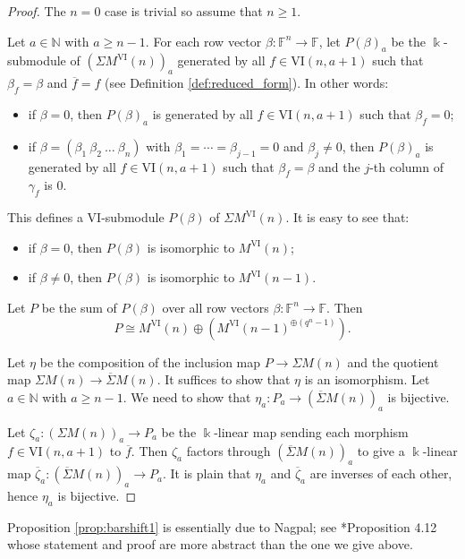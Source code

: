 \documentclass{amsart}
\numberwithin{equation}{section}
\newcommand{\N}{{\mathbb{N}}}
\newcommand{\F}{{\mathbb{F}}}
\newcommand{\VI}{{\mathrm{VI}}}
\newcommand{\SSigma}{{\overline{\Sigma}}}
\begin{document}
\begin{proof}
   The $n=0$ case is trivial so assume that $n\geqslant 1$. 

   Let $a\in \N$ with $a\geqslant n-1$. For each row vector $\beta: \F^n \to \F$, let $P(\beta)_a$ be the $\Bbbk$-submodule of $(\Sigma M^{\VI}(n))_a$ generated by all $f\in \VI(n,a+1)$ such that $\beta_f=\beta$ and $\overline{f}=f$ (see Definition \ref{def:reduced_form}). In other words:
   \begin{itemize}
      \item if $\beta=0$, then $P(\beta)_a$ is generated by all $f\in \VI(n,a+1)$ such that $\beta_f=0$;
      \item if $\beta=(\beta_1 \ \beta_2 \ \ldots \ \beta_n)$ with $\beta_1=\cdots=\beta_{j-1}=0$ and $\beta_j\neq 0$, then $P(\beta)_a$ is generated by all $f\in \VI(n,a+1)$ such that $\beta_f=\beta$ and the $j$-th column of $\gamma_f$ is $0$.
   \end{itemize}    
   This defines a $\VI$-submodule $P(\beta)$ of $\Sigma M^{\VI}(n)$. It is easy to see that:
   \begin{itemize}
      \item if $\beta=0$, then $P(\beta)$ is isomorphic to $M^{\VI}(n)$;
      \item if $\beta\neq 0$, then $P(\beta)$ is isomorphic to $M^{\VI}(n-1)$.
   \end{itemize} 
   Let $P$ be the sum of $P(\beta)$ over all row vectors $\beta: \F^n \to \F$. Then 
   \[ P \cong M^{\VI}(n) \oplus \left( M^{\VI}(n-1)^{\oplus (q^n-1)} \right). \] 
   
   Let $\eta$ be the composition of the inclusion map $P\to \Sigma M(n)$ and the quotient map $\Sigma M(n) \to \SSigma M(n)$. It suffices to show that $\eta$ is an isomorphism. Let $a\in \N$ with $a\geqslant n-1$. We need to show that $\eta_a : P_a \to (\SSigma M(n))_a$ is bijective. 

   Let $\zeta_a: (\Sigma M(n))_a \to P_a$ be the $\Bbbk$-linear map sending each morphism $f\in \VI(n,a+1)$ to $\overline{f}$. Then $\zeta_a$ factors through $(\SSigma M(n))_a$ to give a $\Bbbk$-linear map $\overline{\zeta}_a: (\SSigma M(n))_a \to P_a$. It is plain that $\eta_a$ and $\overline{\zeta}_a$ are inverses of each other, hence $\eta_a$ is bijective.
\end{proof}

Proposition \ref{prop:barshift1} is essentially due to Nagpal; see \cite{na}*{Proposition 4.12} whose statement and proof are more abstract than the one we give above. 
\end{document}
